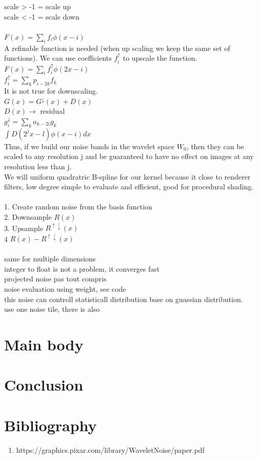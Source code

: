 \documentclass[11pt,a4paper]{article}
\begin{document}
scale > -1 = scale up\\
scale < -1 = scale down\\\\
$F(x) = \sum\limits_{i}f_i \phi(x-i)$\\
A refinable function is needed (when up scaling we keep the same set of functions).
We can use coefficients $f_i^\uparrow$ to upscale the function.\\
$F(x) = \sum\limits_{i}f_i^\uparrow \phi(2x-i)$\\
$f_i^\uparrow =\sum\limits_{k}p_{i-2k}f_k $\\
It is not true for downscaling.\\
$G(x) = G^{\downarrow}(x) + D(x)$\\
$D(x)\longrightarrow$ residual \\
$g_i^\downarrow=\sum\limits_{k}a_{k-2i}g_k $\\
$\int D(2^jx-l)\phi(x-i)dx$\\
Thus, if we build our noise bands in the wavelet space $W_0$, then they can be
scaled to any resolution j and be guaranteed to have no effect on
images at any resolution less than j.
\\
We will uniform quadratric B-spline for our kernel because it close to renderer filters, low degree simple to evaluate and efficient, good for procedural shading.\\\\
1. Create random noise from the basis function\\
2. Downsample $R(x)$\\
3. Upsample $R^{\uparrow\downarrow}(x)$\\
4  $R(x) - R^{\uparrow\downarrow}(x)$\\\\
same for multiple dimensions\\
integer to float is not a problem, it converges fast\\
projected noise pas tout compris\\
noise evaluation using weight, see code\\
this noise can controll statisticall distribution base on guassian distribution.\\
use one noise tile, there is also \\


\section{Main body}



\section{Conclusion}



\section{Bibliography}

\begin{enumerate}
\item https://graphics.pixar.com/library/WaveletNoise/paper.pdf
\end{enumerate}
\end{document}
